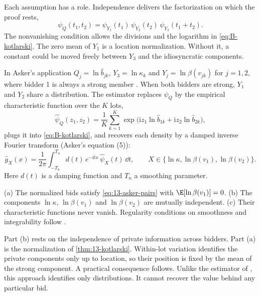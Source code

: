 Each assumption has a role. Independence delivers the factorization on which the proof rests,
\begin{equation*}
\psi_Q(t_1,t_2)=\psi_{Y_1}(t_1)\,\psi_{Y_2}(t_2)\,\psi_{Y_3}(t_1+t_2).
\end{equation*}
The nonvanishing
condition allows the divisions and the logarithm in \eqref{eq:B-kotlarski}. The zero mean of $Y_1$ is a location
normalization. Without it, a constant could be moved freely between $Y_3$ and the idiosyncratic components.

In Asker's application $Q_j=\ln\hat b_{jk}$, $Y_3=\ln\kappa_k$ and $Y_j=\ln\beta(v_{jk})$ for $j=1,2$, where
bidder 1 is always a strong member \citep[footnote 35]{Asker2010}. When both bidders are strong, $Y_1$ and $Y_2$
share a distribution. The estimator replaces $\psi_Q$ by the empirical characteristic function over the $K$
lots,
\begin{equation}\label{eq:13-asker-ecf}
\hat\psi_Q(z_1,z_2)=\frac{1}{K}\sum_{k=1}^{K}\exp\bigl(\mathrm{i}z_1\ln\hat b_{1k}+\mathrm{i}z_2\ln\hat b_{2k}\bigr),
\end{equation}
plugs it into \eqref{eq:B-kotlarski}, and recovers each density by a damped inverse Fourier transform (Asker's
equation (5)):
\begin{equation}\label{eq:13-asker-fourier}
\hat g_X(x)=\frac{1}{2\pi}\int_{-T_n}^{T_n}d(t)\,e^{-\mathrm{i}tx}\,\hat\psi_X(t)\,\dd t,\qquad
X\in\bigl\{\ln\kappa,\ln\beta(v_1),\ln\beta(v_2)\bigr\}.
\end{equation}
Here $d(t)$ is a damping function and $T_n$ a smoothing parameter.

\begin{assumption}\label{asm:13-asker-U}
(a) The normalized bids satisfy \eqref{eq:13-asker-pairs} with $\E[\ln\beta(v_1)]=0$. (b) The components
$\ln\kappa$, $\ln\beta(v_1)$ and $\ln\beta(v_2)$ are mutually independent. (c) Their characteristic functions
never vanish. Regularity conditions on smoothness and integrability follow \citet{LiVuong1998}.
\end{assumption}

Part (b) rests on the independence of private information across bidders. Part (a) is the normalization of
\cref{thm:13-kotlarski}. Within-lot variation identifies the private components only up to location, so their
position is fixed by the mean of the strong component. A practical consequence follows. Unlike the estimator of
\citet{GuerrePerrigneVuong2000}, this approach identifies only distributions. It cannot recover the value behind
any particular bid.

